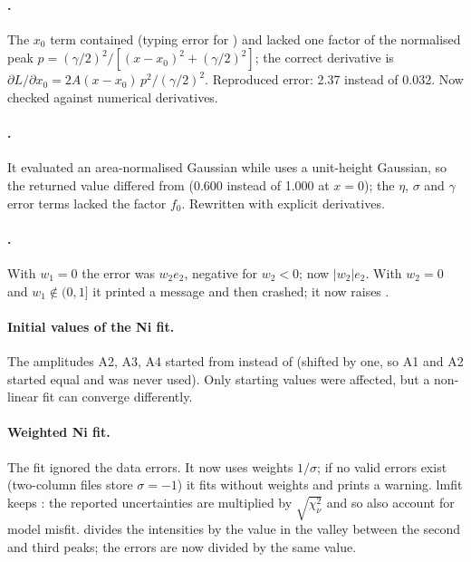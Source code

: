 \documentclass[11pt,a4paper]{article}
\begin{document}
\label{sec:fitting}

\paragraph{ .} The $x_0$ term contained
 (typing error for ) and lacked one factor of
the normalised peak $p = (\gamma/2)^2/[(x-x_0)^2+(\gamma/2)^2]$; the correct
derivative is $\partial L/\partial x_0 = 2A(x-x_0)\,p^2/(\gamma/2)^2$.
Reproduced error: 2.37 instead of 0.032. Now checked against numerical
derivatives.

\paragraph{ .} It evaluated an area-normalised
Gaussian while  uses a unit-height Gaussian, so the returned
value differed from  (0.600 instead of 1.000 at $x=0$); the
$\eta$, $\sigma$ and $\gamma$ error terms lacked the factor $f_0$. Rewritten
with explicit derivatives.

\paragraph{ .} With $w_1=0$ the error was $w_2 e_2$,
negative for $w_2<0$; now $|w_2|e_2$. With $w_2=0$ and $w_1\notin(0,1]$ it
printed a message and then crashed; it now raises .

\paragraph{ Initial values of the Ni fit.} The amplitudes A2, A3,
A4 started from  instead of 
(shifted by one, so A1 and A2 started equal and  was never
used). Only starting values were affected, but a non-linear fit can
converge differently.

\paragraph{ Weighted Ni fit.} \newbeh{} The fit ignored the data
errors. It now uses weights $1/\sigma$; if no valid errors exist
(two-column files store $\sigma=-1$) it fits without weights and prints a
warning. lmfit keeps : the reported uncertainties
are multiplied by $\sqrt{\chi^2_\nu}$ and so also account for model misfit.
 divides the intensities by the value in the
valley between the second and third peaks; the errors are now divided by
the same value.
\end{document}
